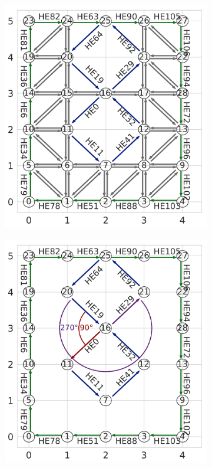 \begin{figure}[ht]
\begin{subfigure}[t]{.23\linewidth}
    \caption{}
    \label{fig:ch2_example1_hole_extreme}
  \end{subfigure}
  \begin{subfigure}[t]{.25\linewidth}
    \centering
    \includegraphics[width=0.99\linewidth]{chapter_2_polylidar/imgs/example_2_all.pdf}
    \caption{}
    \label{fig:ch2_example2_hull}
  \end{subfigure}
  \begin{subfigure}[t]{.25\linewidth}
    \centering
     \includegraphics[width=.99\linewidth]{chapter_2_polylidar/imgs/example_2_choice.pdf}

\end{subfigure}
\end{figure}
